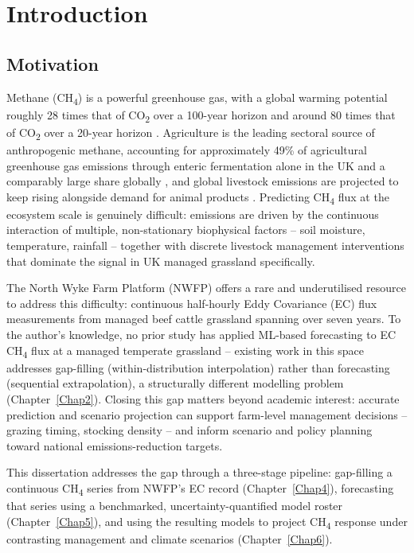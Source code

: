 \chapter{Introduction} \label{Chap1}

\section{Motivation}

Methane (CH\textsubscript{4}) is a powerful greenhouse gas, with a global warming potential
roughly 28 times that of CO\textsubscript{2} over a 100-year horizon and around 80 times that of
CO\textsubscript{2} over a 20-year horizon \cite{ipcc2021}. Agriculture is the leading sectoral
source of anthropogenic methane, accounting for approximately 49\% of agricultural greenhouse gas
emissions through enteric fermentation alone in the UK and a comparably large share globally
\cite{fao2023, eea2024}, and global livestock emissions are projected to keep rising alongside
demand for animal products \cite{fao2023}. Predicting CH\textsubscript{4} flux at the ecosystem
scale is genuinely difficult: emissions are driven by the continuous interaction of multiple,
non-stationary biophysical factors -- soil moisture, temperature, rainfall -- together with
discrete livestock management interventions that dominate the signal in UK managed grassland
specifically.

The North Wyke Farm Platform (NWFP) offers a rare and underutilised resource to address this
difficulty: continuous half-hourly Eddy Covariance (EC) flux measurements from managed beef
cattle grassland spanning over seven years. To the author's knowledge, no prior study has applied
ML-based forecasting to EC CH\textsubscript{4} flux at a managed temperate grassland -- existing
work in this space addresses gap-filling (within-distribution interpolation) rather than
forecasting (sequential extrapolation), a structurally different modelling problem
(Chapter~\ref{Chap2}). Closing this gap matters beyond academic interest: accurate prediction and
scenario projection can support farm-level management decisions -- grazing timing, stocking
density -- and inform scenario and policy planning toward national emissions-reduction targets.

This dissertation addresses the gap through a three-stage pipeline: gap-filling a continuous
CH\textsubscript{4} series from NWFP's EC record (Chapter~\ref{Chap4}), forecasting that series
using a benchmarked, uncertainty-quantified model roster (Chapter~\ref{Chap5}), and using the
resulting models to project CH\textsubscript{4} response under contrasting management and climate
scenarios (Chapter~\ref{Chap6}).

